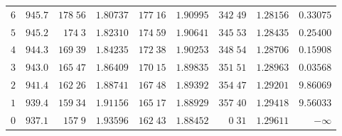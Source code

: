 \begin{center}
\begin{tabular}{r|r|r|r|r|r|r|r|r}
$6$&$945.7$&$178\;56$&$1.80737$&$177\;16$&$1.90995$&$342\;49$&$1.28156$&$0.33075$\\[2pt]
$5$&$945.2$&$174\;3$&$1.82310$&$174\;59$&$1.90641$&$345\;53$&$1.28435$&$0.25400$\\
$4$&$944.3$&$169\;39$&$1.84235$&$172\;38$&$1.90253$&$348\;54$&$1.28706$&$0.15908$\\
$3$&$943.0$&$165\;47$&$1.86409$&$170\;15$&$1.89835$&$351\;51$&$1.28963$&$0.03568$\\
$2$&$941.4$&$162\;26$&$1.88741$&$167\;48$&$1.89392$&$354\;47$&$1.29201$&$9.86069$\\
$1$&$939.4$&$159\;34$&$1.91156$&$165\;17$&$1.88929$&$357\;40$&$1.29418$&$9.56033$\\[2pt]
$0$&$937.1$&$157\;9$&$1.93596$&$162\;43$&$1.88452$&$0\;31$&$1.29611$&$-\infty$\\
\hline
\end{tabular}
\end{center}
\endgroup
\clearpage
{}
\begingroup
\fontsize{9}{10.2}\selectfont
\setlength{\tabcolsep}{1.5pt}
\renewcommand{\arraystretch}{1.02}
